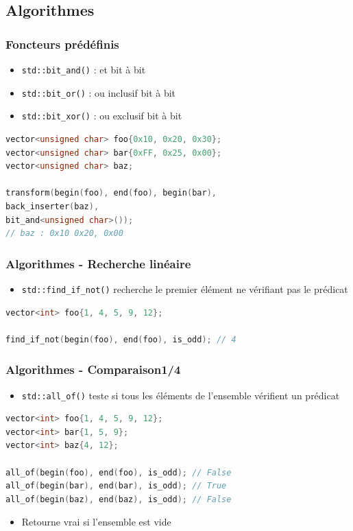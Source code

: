 \documentclass[C++.tex]{subfiles}
\begin{document}
\subsection*{Algorithmes}
\begin{frame}[fragile]
	\frametitle{Foncteurs prédéfinis}
	\begin{itemize}
		\item \lstinline|std::bit_and()| : et bit à bit
		\item \lstinline|std::bit_or()| : ou inclusif bit à bit
		\item \lstinline|std::bit_xor()| : ou exclusif bit à bit
	\end{itemize}

	\begin{lstlisting}[language=C++]
vector<unsigned char> foo{0x10, 0x20, 0x30};
vector<unsigned char> bar{0xFF, 0x25, 0x00};
vector<unsigned char> baz;

transform(begin(foo), end(foo), begin(bar), 
back_inserter(baz), 
bit_and<unsigned char>());
// baz : 0x10 0x20, 0x00\end{lstlisting}
\end{frame}

\begin{frame}[fragile]
	\frametitle{Algorithmes - Recherche linéaire}
	\begin{itemize}
		\item \lstinline|std::find_if_not()| recherche le premier élément ne vérifiant pas le prédicat
	\end{itemize}

	\begin{lstlisting}[language=C++]
vector<int> foo{1, 4, 5, 9, 12};

find_if_not(begin(foo), end(foo), is_odd); // 4\end{lstlisting}
\end{frame}

\begin{frame}[fragile]
	\frametitle{Algorithmes - Comparaison\titlehfill{}1/4}
	\begin{itemize}
		\item \lstinline|std::all_of()| teste si tous les éléments de l'ensemble vérifient un prédicat
	\end{itemize}

	\begin{lstlisting}[language=C++]
vector<int> foo{1, 4, 5, 9, 12};
vector<int> bar{1, 5, 9};
vector<int> baz{4, 12};

all_of(begin(foo), end(foo), is_odd); // False
all_of(begin(bar), end(bar), is_odd); // True
all_of(begin(baz), end(baz), is_odd); // False\end{lstlisting}

	\begin{itemize}
		\item Retourne vrai si l'ensemble est vide
	\end{itemize}
\end{frame}
\end{document}

